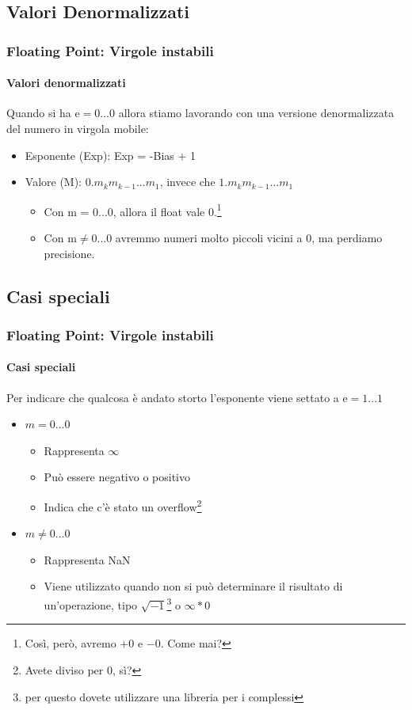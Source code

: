 \documentclass{beamer}
\begin{document}
  \subsection{Valori Denormalizzati}
	  \begin{frame}
	    \frametitle{Floating Point: Virgole instabili}
	    \framesubtitle{Valori denormalizzati}
	    Quando si ha $\text{e} = 0\text{...}0$ allora stiamo lavorando con una versione
	    denormalizzata del numero in virgola mobile:
	    
	    \begin{itemize}
	      \item Esponente (Exp): Exp = -Bias + 1
	      \item Valore (M): $0.m_{k}m_{k-1}...m_{1}$, invece che $1.m_{k}m_{k-1}...m_{1}$      
	        \begin{itemize}
	      			\item Con m = 0...0, allora il float vale 0.\footnote{Così, però, avremo $+0$ e $-0$. Come mai?}
	      			\item Con $\text{m} \neq 0\text{...}0$ avremmo numeri molto piccoli vicini a 0, ma perdiamo precisione.
	      		\end{itemize}
	    \end{itemize}
	  \end{frame}
	  \subsection{Casi speciali}
	  \begin{frame}
	    \frametitle{Floating Point: Virgole instabili}
	    \framesubtitle{Casi speciali}
	    Per indicare che qualcosa è andato storto l'esponente viene settato a $\text{e} = 1\text{...}1$
	    
	    \begin{itemize}
	      \item $m = 0\text{...}0$
	      		\begin{itemize}
	      			\item Rappresenta $\infty$
	      			\item Può essere negativo o positivo
	      			\item Indica che c'è stato un overflow\footnote{Avete diviso per 0, sì?}
	      		\end{itemize}
	      	\item $m \neq 0\text{...}0$
	      		\begin{itemize}
	      			\item Rappresenta NaN
	      			\item Viene utilizzato quando non si può determinare il risultato di un'operazione, tipo $\sqrt{-1}$\footnote{per
	      				questo dovete utilizzare una libreria per i complessi} o $\infty * 0$
	      		\end{itemize}
	    \end{itemize}
	  \end{frame}
\end{document}

